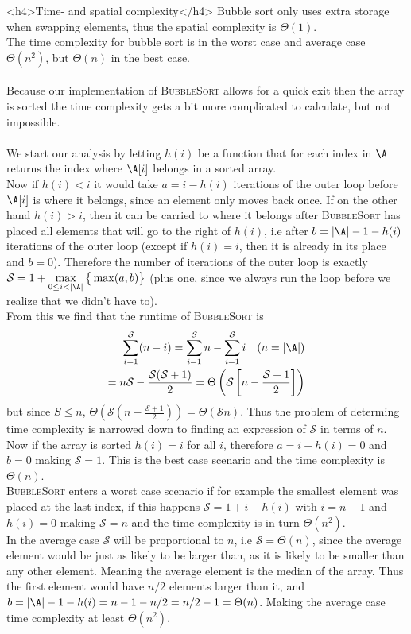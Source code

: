 <h4>Time- and spatial complexity</h4>
Bubble sort only uses extra storage when swapping elements, thus the spatial complexity is $\Theta(1)$.\\
The time complexity for bubble sort is in the worst case and average case $\Theta(n^2)$, but $\Theta(n)$ in the 
best case.
\\\\
Because our implementation of \textsc{BubbleSort} allows for a quick exit then the array is sorted the time
complexity gets a bit more complicated to calculate, but not impossible. \\\\
We start our analysis by letting $h(i)$ be a function that for each index in $\A$ returns the index where 
$\A[i]$ belongs in a sorted array.\\
Now if $h(i)< i$ it would take $a=i-h(i)$ iterations of the outer loop before $\A[i]$ is where it belongs,
since an element only moves back once. If on the other hand $h(i)>i$, then it can be carried to where it belongs
after \textsc{BubbleSort} has placed all elements that will go to the right of $h(i)$, i.e after $b=|\A|-1-h(i)$ 
iterations of the outer loop (except if $h(i)=i$, then it is already in its place and $b=0$). 
Therefore the number of iterations of the 
outer loop is exactly $\mathcal S=1+\displaystyle\max_{0\leq i<|\A|} \big\{\max(a,b)\big\}$ 
(plus one, since we always run the loop before we realize that we didn't have to).\\
From this we find that the runtime of \textsc{BubbleSort} is 
\begin{equation*}
    \begin{split}
        \sum_{i=1}^{\mathcal S} (n - i)=\sum_{i=1}^{\mathcal S} n-\sum_{i=1}^{\mathcal S} i\quad(n=|\A|)\\
        =n\mathcal S-\frac{\mathcal S(\mathcal S + 1)}{2}=
        \Theta\left(\mathcal S\left[n-\frac{\mathcal S + 1}{2}\right]\right)
    \end{split}
\end{equation*}
but since $S\leq n$, $\Theta\left(\mathcal S(n-\frac{\mathcal S + 1}{2})\right)=\Theta(\mathcal S n)$.
Thus the problem of determing time complexity is narrowed down to finding an expression of $\mathcal S$ 
in terms of $n$. Now if the array is sorted $h(i)=i$ for all $i$, therefore $a=i-h(i)=0$ and $b=0$ making 
$\mathcal S=1$. This is the best case scenario and the time complexity is $\Theta(n)$. 
\\
\textsc{BubbleSort} enters a worst case scenario if for example the smallest element was placed at the last index,
if this happens $\mathcal S=1+i-h(i)$ with $i=n-1$ and $h(i)=0$ making $\mathcal S=n$ and the time complexity is 
in turn $\Theta(n^2)$.
\\
In the average case $\mathcal S$ will be proportional to $n$, i.e $\mathcal S=\Theta(n)$, since the average
element would be just as likely to be larger than, as it is likely to be smaller than any other element. 
Meaning the average element is the median of the array. Thus the first element would have $n/2$ elements
larger than it, and $b=|\A|-1-h(i)=n-1-n/2=n/2-1=\Theta(n)$. Making the average case time complexity at least
$\Theta(n^2)$.


